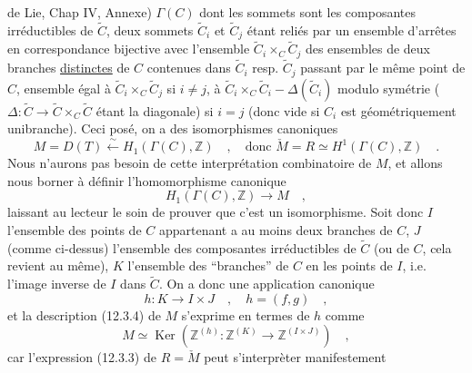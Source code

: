 de Lie, Chap IV, Annexe) $\Gamma(C)$ dont les sommets sont les composantes irréductibles de $\widetilde C$, deux sommets $\widetilde C_i$ et $\widetilde C_j$ étant reliés par un ensemble d'arrêtes en correspondance bijective avec l'ensemble $\widetilde C_i\times_C\widetilde C_j$ des ensembles de deux branches \uline{distinctes} de $C$ contenues dans $\widetilde C_i$ resp. $\widetilde C_j$ passant par le même point de $C$, ensemble égal à $\widetilde C_i\times_C\widetilde C_j$ si $i\ne j$, à $\widetilde C_i\times_C\widetilde C_i-\Delta(\widetilde C_i)$ modulo symétrie ($\Delta:\widetilde C\longrightarrow\widetilde C\times_C\widetilde C$ étant la diagonale) si $i=j$ (donc vide si $C_i$ est géométriquement unibranche). Ceci posé, on a des isomorphismes canoniques
\[
 M=D(T)\xleftarrow{\sim}H_1(\Gamma(C),\mathbb{Z})\quad,\quad
 \text{donc }\check M=R\simeq H^1(\Gamma(C),\mathbb{Z})\quad .\tag*{(12.3.7)}
\]
Nous n'aurons pas besoin de cette interprétation combinatoire de $M$, et allons nous borner à définir l'homomorphisme canonique
\[
 H_1(\Gamma(C),\mathbb{Z})\longrightarrow M\quad ,
\]
laissant au lecteur le soin de prouver que c'est un isomorphisme. Soit donc $I$ l'ensemble des points de $C$ appartenant a au moins deux branches de $C$, $J$ (comme ci-dessus) l'ensemble des composantes irréductibles de $\widetilde C$ (ou de $C$, cela revient au même), $K$ l'ensemble des ``branches'' de $C$ en les points de $I$, i.e. l'image inverse de $I$ dans $\widetilde C$. On a donc une application canonique
\[
 h:K\longrightarrow I\times J\quad,\quad h=(f,g)\quad ,\tag*{(12.3.9)}
\]
et la description (12.3.4) de $M$ s'exprime en termes de $h$ comme
\[
 M\simeq\operatorname{Ker}(\mathbb{Z}^{(h)}:\mathbb{Z}^{(K)}\longrightarrow\mathbb{Z}^{(I\times J)})\quad ,\tag*{(12.3.10)}
\]
car l'expression (12.3.3) de $R=\check M$ peut s'interprèter manifestement

